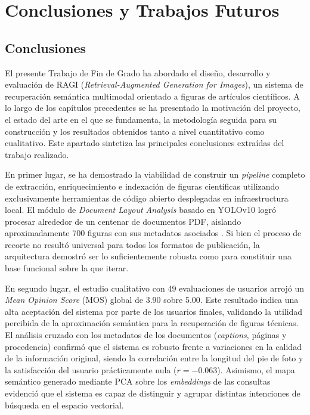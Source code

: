 \documentclass[../main.tex]{subfiles}
\begin{document}
\chapter{Conclusiones y Trabajos Futuros}
\label{sec:conclusiones}

\section{Conclusiones}
\label{sec:conclusiones_principales}

El presente Trabajo de Fin de Grado ha abordado el diseño, desarrollo y evaluación de RAGI (\textit{Retrieval-Augmented Generation for Images}), un sistema de recuperación semántica multimodal orientado a figuras de artículos científicos. A lo largo de los capítulos precedentes se ha presentado la motivación del proyecto, el estado del arte en el que se fundamenta, la metodología seguida para su construcción y los resultados obtenidos tanto a nivel cuantitativo como cualitativo. Este apartado sintetiza las principales conclusiones extraídas del trabajo realizado.

En primer lugar, se ha demostrado la viabilidad de construir un \textit{pipeline} completo de extracción, enriquecimiento e indexación de figuras científicas utilizando exclusivamente herramientas de código abierto desplegadas en infraestructura local. El módulo de \textit{Document Layout Analysis} basado en YOLOv10 logró procesar alrededor de un centenar de documentos PDF, aislando aproximadamente 700 figuras con sus metadatos asociados \cite{wang2024yolov10}. Si bien el proceso de recorte no resultó universal para todos los formatos de publicación, la arquitectura demostró ser lo suficientemente robusta como para constituir una base funcional sobre la que iterar.

En segundo lugar, el estudio cualitativo con 49 evaluaciones de usuarios arrojó un \textit{Mean Opinion Score} (MOS) global de 3.90 sobre 5.00. Este resultado indica una alta aceptación del sistema por parte de los usuarios finales, validando la utilidad percibida de la aproximación semántica para la recuperación de figuras técnicas. El análisis cruzado con los metadatos de los documentos (\textit{captions}, páginas y procedencia) confirmó que el sistema es robusto frente a variaciones en la calidad de la información original, siendo la correlación entre la longitud del pie de foto y la satisfacción del usuario prácticamente nula ($r = -0.063$). Asimismo, el mapa semántico generado mediante PCA sobre los \textit{embeddings} de las consultas evidenció que el sistema es capaz de distinguir y agrupar distintas intenciones de búsqueda en el espacio vectorial.
\end{document}
